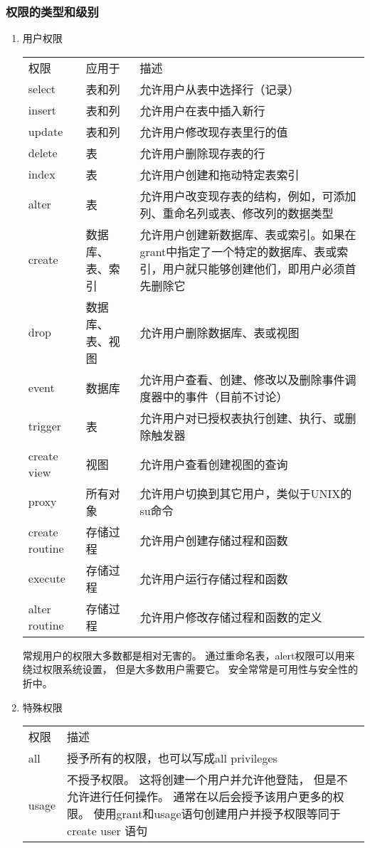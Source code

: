 \documentclass[11pt]{article}
\begin{document}
\subsubsection{权限的类型和级别}
\label{sec:org1047e59}
\begin{enumerate}
\item 用户权限
\label{sec:orga7b4d3b}
\begin{center}
\begin{tabular}{lll}
权限 & 应用于 & 描述\\
select & 表和列 & 允许用户从表中选择行（记录）\\
insert & 表和列 & 允许用户在表中插入新行\\
update & 表和列 & 允许用户修改现存表里行的值\\
delete & 表 & 允许用户删除现存表的行\\
index & 表 & 允许用户创建和拖动特定表索引\\
alter & 表 & 允许用户改变现存表的结构，例如，可添加列、重命名列或表、修改列的数据类型\\
create & 数据库、表、索引 & 允许用户创建新数据库、表或索引。如果在grant中指定了一个特定的数据库、表或索引，用户就只能够创建他们，即用户必须首先删除它\\
drop & 数据库、表、视图 & 允许用户删除数据库、表或视图\\
event & 数据库 & 允许用户查看、创建、修改以及删除事件调度器中的事件（目前不讨论）\\
trigger & 表 & 允许用户对已授权表执行创建、执行、或删除触发器\\
create view & 视图 & 允许用户查看创建视图的查询\\
proxy & 所有对象 & 允许用户切换到其它用户，类似于UNIX的su命令\\
create routine & 存储过程 & 允许用户创建存储过程和函数\\
execute & 存储过程 & 允许用户运行存储过程和函数\\
alter routine & 存储过程 & 允许用户修改存储过程和函数的定义\\
\end{tabular}
\end{center}
常规用户的权限大多数都是相对无害的。 通过重命名表，alert权限可以用来绕过权限系统设置， 但是大多数用户需要它。  安全常常是可用性与安全性的折中。
\item 特殊权限
\label{sec:org81e80f4}
\begin{center}
\begin{tabular}{ll}
权限 & 描述\\
all & 授予所有的权限，也可以写成all privileges\\
usage & 不授予权限。 这将创建一个用户并允许他登陆， 但是不允许进行任何操作。  通常在以后会授予该用户更多的权限。 使用grant和usage语句创建用户并授予权限等同于create user 语句\\
\end{tabular}
\end{center}
\end{enumerate}
\end{document}
